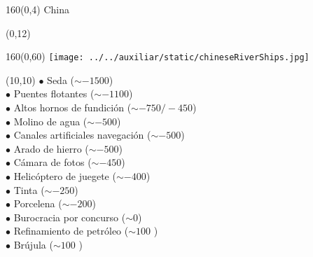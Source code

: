 \documentclass[shownotes,aspectratio=169]{beamer}
\begin{document}
\begin{frame}[plain]
 \begin{textblock}{160}(0,4)
  \LARGE \centering \textcolor{black!85}{China}
 \end{textblock} 



\begin{textblock}{80}(0,12)
  \Large \centering \textcolor{black!85}{}
\end{textblock} 
\begin{textblock}{160}(0,60)
  \centering
\texttt{[image: ../../auxiliar/static/chineseRiverShips.jpg]}  
  \end{textblock} 

\begin{textblock}{70}(10,10) \footnotesize
 $\bullet$ Seda ($\sim -1500$) \\
 $\bullet$ Puentes flotantes ($\sim -1100$) \\
 $\bullet$ Altos hornos de fundición ($\sim -750/-450$) \\
 $\bullet$ Molino de agua ($\sim -500$) \\
 $\bullet$ Canales artificiales navegación ($\sim -500$) \\
 $\bullet$ Arado de hierro ($\sim -500$) \\
 $\bullet$ Cámara de fotos ($\sim -450$) \\
 $\bullet$ Helicóptero de juegete ($\sim -400$) \\
 $\bullet$ Tinta ($\sim -250$) \\
 $\bullet$ Porcelena ($\sim -200$) \\
 $\bullet$ Burocracia por concurso ($\sim 0$) \\
 $\bullet$ Refinamiento de petróleo ($\sim 100$ ) \\
 $\bullet$ Brújula ($\sim 100$ ) 
 \end{textblock} 



\end{frame}
\end{document}
